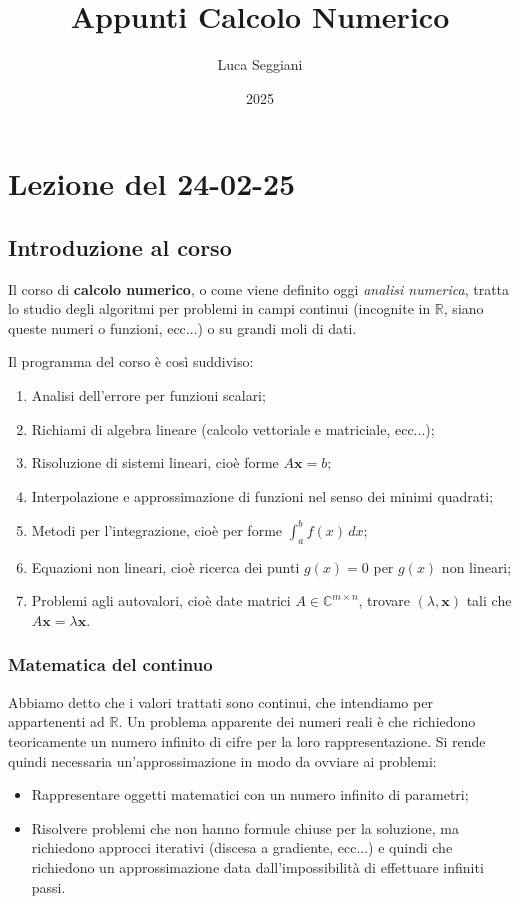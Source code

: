 \documentclass[a4paper,11pt]{article}
\title{Appunti Calcolo Numerico}
\author{Luca Seggiani}
\date{2025}
\begin{document}
\section{Lezione del 24-02-25}

\thispagestyle{empty}
\pagestyle{fancy}

\subsection{Introduzione al corso}
Il corso di \textbf{calcolo numerico}, o come viene definito oggi \textit{analisi numerica}, tratta lo studio degli algoritmi per problemi in campi continui (incognite in $\mathbb{R}$, siano queste numeri o funzioni, ecc...) o su grandi moli di dati.

Il programma del corso è così suddiviso:
\begin{enumerate}
	\item Analisi dell'errore per funzioni scalari;
	\item Richiami di algebra lineare (calcolo vettoriale e matriciale, ecc...);
	\item Risoluzione di sistemi lineari, cioè forme $A\mathbf{x} = b$;
	\item Interpolazione e approssimazione di funzioni nel senso dei minimi quadrati;
	\item Metodi per l'integrazione, cioè per forme $\int_a^b f(x) \, dx$;
	\item Equazioni non lineari, cioè ricerca dei punti $g(x) = 0$ per $g(x)$ non lineari;
	\item Problemi agli autovalori, cioè date matrici $A \in \mathbb{C}^{m \times n}$, trovare $(\lambda, \mathbf{x})$ tali che $A\mathbf{x} = \lambda \mathbf{x}$.
\end{enumerate}

\subsubsection{Matematica del continuo}
Abbiamo detto che i valori trattati sono continui, che intendiamo per appartenenti ad $\mathbb{R}$.
Un problema apparente dei numeri reali è che richiedono teoricamente un numero infinito di cifre per la loro rappresentazione.
Si rende quindi necessaria un'approssimazione in modo da ovviare ai problemi:
\begin{itemize}
	\item Rappresentare oggetti matematici con un numero infinito di parametri;
	\item Risolvere problemi che non hanno formule chiuse per la soluzione, ma richiedono approcci iterativi (discesa a gradiente, ecc...) e quindi che richiedono un approssimazione data dall'impossibilità di effettuare infiniti passi.
\end{itemize}
\end{document}
